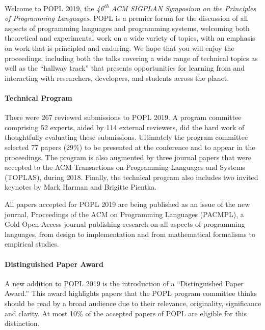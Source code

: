 \label{Preface}


\newcommand\person[1]{{#1}}

\noindent

Welcome to POPL 2019, the
\emph{46\textsuperscript{th} ACM SIGPLAN Symposium
on the Principles of Programming Languages}.
%
POPL is a premier forum for the discussion of all aspects
of programming languages and programming systems, welcoming
both theoretical and experimental work on a wide variety of
topics, with an emphasis on work that is principled and enduring.
%
We hope that you will enjoy the proceedings,
including both the talks covering a wide range
of technical topics as well as the ``hallway track''
that presents opportunities for learning from
and interacting with researchers, developers,
and students across the planet.


\paragraph{Technical Program}
%
There were 267 reviewed submissions to POPL 2019.
%
A program committee comprising 52 experts,
aided by 114 external reviewers, did the hard work of
thoughtfully evaluating these submissions.
%
Ultimately the program committee selected 77 papers (29\%)
to be presented at the conference and to appear in the
proceedings. 
%
The program is also augmented by three journal papers that were accepted to
the ACM Transactions on Programming Languages and Systems (TOPLAS), during
2018.
%
Finally, the technical program also includes two invited keynotes by Mark Harman
and Brigitte Pientka.

All papers accepted for POPL 2019 are being published as an issue of the new
journal, Proceedings of the ACM on Programming Languages (PACMPL), a Gold Open
Access journal publishing research on all aspects of programming languages,
from design to implementation and from mathematical formalisms to empirical
studies.

\paragraph{Distinguished Paper Award}

A new addition to POPL 2019 is the introduction of a ``Distinguished Paper
Award.'' This award highlights papers that the POPL program committee thinks
should be read by a broad audience due to their relevance, originality,
significance and clarity. At most 10\% of the accepted papers of POPL are
eligible for this distinction.

